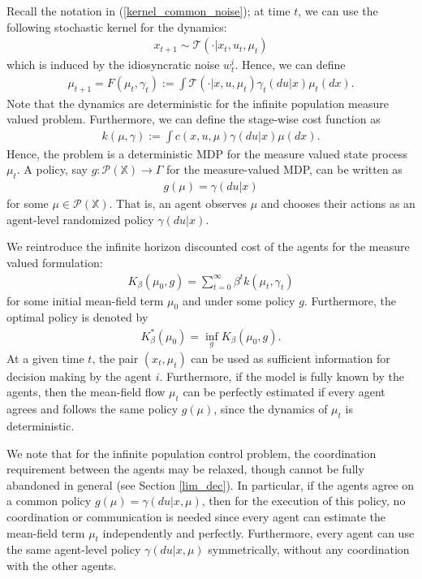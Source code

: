 \documentclass[twoside,11pt]{article}
\def\P{{\mathcal P}}
\begin{document}
 Recall the notation in (\ref{kernel_common_noise}); at time $t$, we can use the following stochastic kernel for the dynamics:
\begin{align*}
x_{t+1}\sim \mathcal{T}(\cdot|x_t,u_t,\mu_t)
\end{align*}
which is induced by the idiosyncratic noise $w^i_t$. Hence, we can define
\begin{align}\label{inf_kernel}
\mu_{t+1}=F(\mu_t,\gamma_t):= \int \mathcal{T}(\cdot|x,u,\mu_t)\gamma_t(du|x)\mu_t(dx).
\end{align}
Note that the dynamics are deterministic for the infinite population measure valued problem. Furthermore, we can define the stage-wise cost function as
\begin{align}\label{inf_cost}
k(\mu,\gamma):=\int c(x,u,\mu)\gamma(du|x)\mu(dx).
\end{align}
Hence, the problem is a deterministic MDP for the measure valued state process $\mu_t$. A policy, say $g:\P(\mathds{X})\to \Gamma$ for the measure-valued MDP, can be written as
\begin{align*}
g(\mu)=\gamma(du|x)
\end{align*}
for some $\mu\in\P(\mathds{X})$. That is, an agent observes $\mu$ and chooses their actions as an agent-level randomized policy $\gamma(du|x)$. 

We reintroduce the infinite horizon discounted cost of the agents for the measure valued formulation:
\begin{align*}
K_\beta(\mu_0,g) = \sum_{t=0}^\infty \beta^t k(\mu_t,\gamma_t)
\end{align*}
for some initial mean-field term $\mu_0$ and under some policy $g$. Furthermore, the optimal policy is denoted by 
\begin{align*}
K_\beta^*(\mu_0) = \inf_g K_\beta(\mu_0,g).
\end{align*}
At a given time $t$, the pair $(x_t,\mu_t)$ can be used as sufficient information for decision making by the agent $i$. Furthermore, if the model is fully known by the agents, then the mean-field flow $\mu_t$ can be perfectly estimated if every agent agrees and follows the same policy $g(\mu)$, since the dynamics of $\mu_t$ is deterministic.

We note that  for the infinite population control problem, the coordination requirement between the agents may be relaxed, though cannot be fully abandoned in general (see Section \ref{lim_dec}).  In particular, if the agents agree on a common policy $g(\mu)=\gamma(du|x,\mu)$, then for the execution of this policy, no coordination or communication is needed since every agent can estimate the mean-field term $\mu_t$ independently and perfectly.  Furthermore, every agent can use the same agent-level policy $\gamma(du|x,\mu)$ symmetrically, without any coordination with the other agents.
\end{document}
